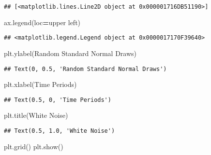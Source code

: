 \documentclass[
]{book}
\newenvironment{Shaded}{\begin{snugshade}}{\end{snugshade}}
\newcommand{\NormalTok}[1]{#1}
\newcommand{\OperatorTok}[1]{\textcolor[rgb]{0.81,0.36,0.00}{\textbf{#1}}}
\newcommand{\StringTok}[1]{\textcolor[rgb]{0.31,0.60,0.02}{#1}}
\begin{document}
\begin{verbatim}
## [<matplotlib.lines.Line2D object at 0x000001716DB51190>]
\end{verbatim}

\begin{Shaded}
\begin{Highlighting}[]
\NormalTok{ax.legend(loc}\OperatorTok{=}\StringTok{\textquotesingle{}upper left\textquotesingle{}}\NormalTok{)}
\end{Highlighting}
\end{Shaded}

\begin{verbatim}
## <matplotlib.legend.Legend object at 0x0000017170F39640>
\end{verbatim}

\begin{Shaded}
\begin{Highlighting}[]
\NormalTok{plt.ylabel(}\StringTok{\textquotesingle{}Random Standard Normal Draws\textquotesingle{}}\NormalTok{)}
\end{Highlighting}
\end{Shaded}

\begin{verbatim}
## Text(0, 0.5, 'Random Standard Normal Draws')
\end{verbatim}

\begin{Shaded}
\begin{Highlighting}[]
\NormalTok{plt.xlabel(}\StringTok{\textquotesingle{}Time Periods\textquotesingle{}}\NormalTok{)}
\end{Highlighting}
\end{Shaded}

\begin{verbatim}
## Text(0.5, 0, 'Time Periods')
\end{verbatim}

\begin{Shaded}
\begin{Highlighting}[]
\NormalTok{plt.title(}\StringTok{\textquotesingle{}White Noise\textquotesingle{}}\NormalTok{)}
\end{Highlighting}
\end{Shaded}

\begin{verbatim}
## Text(0.5, 1.0, 'White Noise')
\end{verbatim}

\begin{Shaded}
\begin{Highlighting}[]
\NormalTok{plt.grid()}
\NormalTok{plt.show()}
\end{Highlighting}
\end{Shaded}
\end{document}
